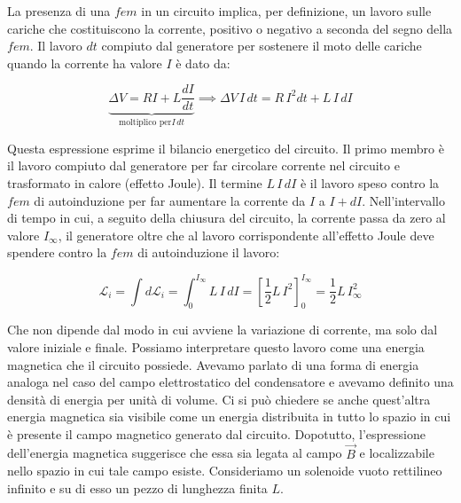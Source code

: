 La presenza di una $fem$ in un circuito implica, per definizione, un lavoro sulle cariche che costituiscono la corrente, positivo o negativo a seconda del segno della $fem$. Il lavoro $dt$ compiuto dal generatore per sostenere il moto delle cariche quando la corrente ha valore $I$ è dato da:

\[
	\underbrace{\Delta V = RI + L\frac{dI}{dt}}_{\text{moltiplico per}I\,dt} \implies \Delta V\,I\,dt = R\,I^2 dt + L\,I\,dI
\]

Questa espressione esprime il bilancio energetico del circuito. Il primo membro è il lavoro compiuto dal generatore per far circolare corrente nel circuito e trasformato in calore (effetto Joule). Il termine $L\,I\,dI$ è il lavoro speso contro la $fem$ di autoinduzione per far aumentare la corrente da $I$ a $I+dI$. Nell'intervallo di tempo in cui, a seguito della chiusura del circuito, la corrente passa da zero al valore $ I_{\infty}  $, il generatore oltre che al lavoro corrispondente all'effetto Joule deve spendere contro la $fem$ di autoinduzione il lavoro:

\[
	\mathcal{L}_i = \int d\mathcal{L}_i = \int_0^{I_{\infty}} L\,I\,dI = \left[ \frac{1}{2} L\,I^2  \right]_0^{I_{\infty}} = \frac{1}{2} L\,I_{\infty}^2
\]

Che non dipende dal modo in cui avviene la variazione di corrente, ma solo dal valore iniziale e finale. Possiamo interpretare questo lavoro come una energia magnetica che il circuito possiede. Avevamo parlato di una forma di energia analoga nel caso del campo elettrostatico del condensatore e avevamo definito una densità di energia per unità di volume. Ci si può chiedere se anche quest'altra energia magnetica sia visibile come un energia distribuita in tutto lo spazio in cui è presente il campo magnetico generato dal circuito. Dopotutto, l'espressione dell'energia magnetica suggerisce che essa sia legata al campo $\vec{B}$ e localizzabile nello spazio in cui tale campo esiste. Consideriamo un solenoide vuoto rettilineo infinito e su di esso un pezzo di lunghezza finita $L$.

